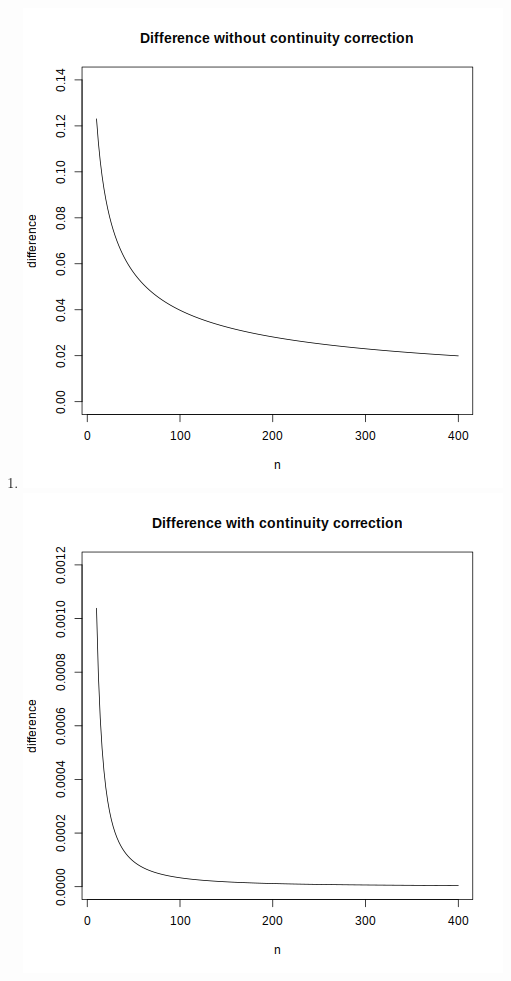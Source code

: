 \documentclass[12pt,letterpaper]{article}
\begin{document}
\begin{enumerate}
\begin{enumerate}
        \item
          \includegraphics[width=\linewidth/2-10pt]{prob3c1.png}
          \includegraphics[width=\linewidth/2-10pt]{prob3c2.png}


\end{enumerate}
\end{enumerate}
\end{document}
